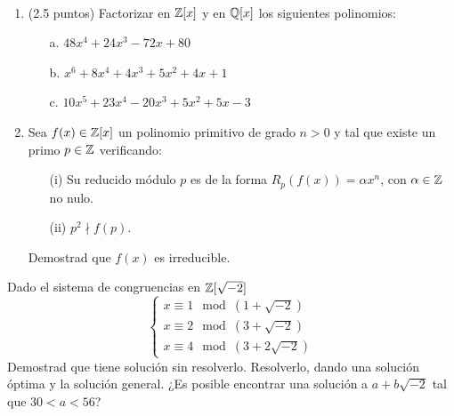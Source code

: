\documentclass[12pt]{article}
\newcounter{ejercicio}[section] %
\newcounter{ejercicio}
\newcommand{\resetearcontador}{%
  \setcounter{ejercicio}{0} %
}
\begin{document}
    \begin{ejercicio}[3.5 puntos]
        \ 
        \begin{enumerate}
            \item (2.5 puntos) Factorizar en $\mathbb{Z}[x]$ y en $\mathbb{Q}[x]$ los siguientes polinomios:
            \begin{enumerate}
                \item[a.] $48x^4 + 24x^3 -72x +80$
                \item[b.] $x^6 + 8x^4 + 4x^3 + 5x^2 + 4x+1$
                \item[c.] $10x^5 + 23x^4 -20x^3 + 5x^2 + 5x-3$
            \end{enumerate}
            \item Sea $f(x) \in \mathbb{Z}[x]$ un polinomio primitivo de grado $n>0$ y tal que existe un primo $p \in \mathbb{Z}$ verificando:
                \begin{enumerate}
                    \item[(i)] Su reducido módulo $p$ es de la forma $R_p(f(x)) = \alpha x^n$, con $\alpha \in \mathbb{Z}$ no nulo.
                    \item[(ii)] $p^2 \nmid f(p)$. 
                \end{enumerate}
                Demostrad que $f(x)$ es irreducible.
        \end{enumerate}
    \end{ejercicio}

    \begin{ejercicio}[2.5 puntos]
        Dado el sistema de congruencias en $\mathbb{Z}[\sqrt{-2}]$
        $$\left\{ \begin{array}{l}
            x \equiv 1 \mod (1+\sqrt{-2}) \\
            x \equiv 2 \mod (3+\sqrt{-2}) \\
            x \equiv 4 \mod (3+2\sqrt{-2}) 
        \end{array}\right.$$
        Demostrad que tiene solución sin resolverlo. Resolverlo, dando una solución óptima y la solución general. \newline
        ¿Es posible encontrar una solución a $a + b\sqrt{-2}$ tal que $30 < a < 56$?
    \end{ejercicio}

    \newpage
    \ %
    \newpage
    \resetearcontador
    
\end{document}
